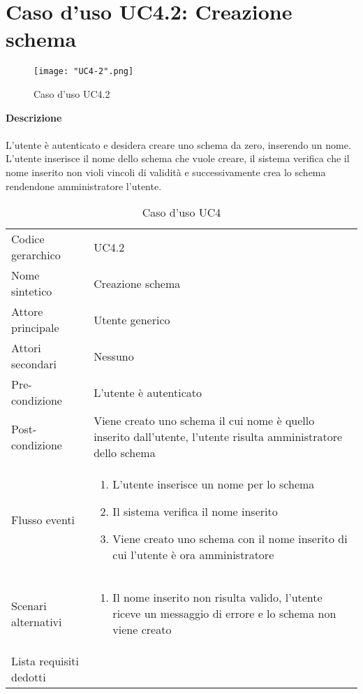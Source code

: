 \documentclass[a4paper]{report}
\begin{document}
	 \section{Caso d'uso UC4.2: Creazione schema}
	 	\begin{figure}[H]
			\centering
			\texttt{[image: "UC4-2".png]}
			\caption{Caso d'uso UC4.2}
		\end{figure}
	 \textbf{Descrizione} \\ \\
	 L'utente è autenticato e desidera creare uno schema da zero, inserendo un nome. L'utente inserisce il
	 nome dello schema che vuole creare, il sistema verifica che il nome inserito non violi vincoli di validità e
	 successivamente crea lo schema rendendone amministratore l'utente.
		\begin{table}[H]
		\begin{tabularx}{\textwidth}{X | X}\toprule
			\rowcolor{orange!65}Codice gerarchico & UC4.2 \\
			Nome sintetico & Creazione schema \\
			\rowcolor{orange!65}Attore principale & Utente generico\\
			Attori secondari & Nessuno \\
			\rowcolor{orange!65}Pre-condizione & L'utente è autenticato\\
			Post-condizione & Viene creato uno schema il cui nome è quello inserito dall'utente, l'utente
			risulta amministratore dello schema \\
			\rowcolor{orange!65}Flusso eventi & \begin{enumerate}
			\item L'utente inserisce un nome per lo schema
			\item Il sistema verifica il nome inserito
			\item Viene creato uno schema con il nome inserito di cui l'utente è ora amministratore
			\end{enumerate} \\
			Scenari alternativi & \begin{enumerate}
			\item Il nome inserito non risulta valido, l'utente riceve un messaggio di errore e lo schema non
			 viene creato
			\end{enumerate} \\
			\rowcolor{orange!65}Lista requisiti dedotti & \\
			\bottomrule
		\end{tabularx}
		\caption{Caso d'uso UC4}
	 \end{table}
\end{document}
